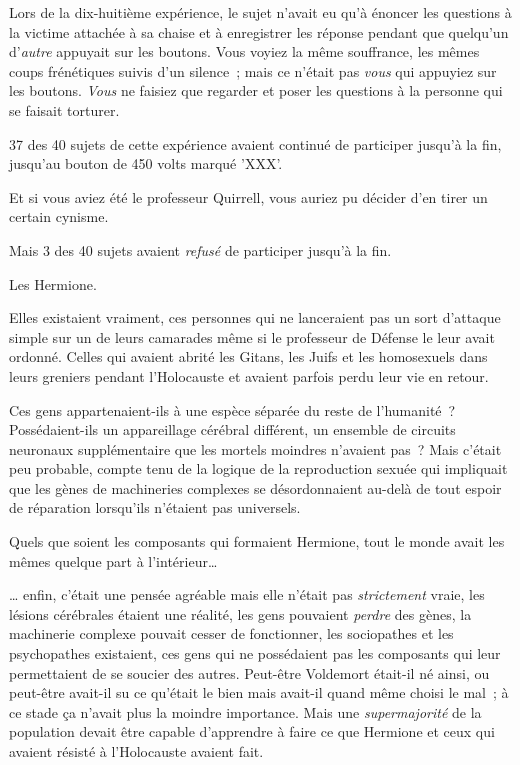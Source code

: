 Lors de la dix-huitième expérience, le sujet n'avait eu qu'à énoncer les questions à la victime attachée à sa chaise et à enregistrer les réponse pendant que quelqu'un d'\emph{autre} appuyait sur les boutons. Vous voyiez la même souffrance, les mêmes coups frénétiques suivis d'un silence~; mais ce n'était pas \emph{vous} qui appuyiez sur les boutons. \emph{Vous} ne faisiez que regarder et poser les questions à la personne qui se faisait torturer.

37 des 40 sujets de cette expérience avaient continué de participer jusqu'à la fin, jusqu'au bouton de 450 volts marqué 'XXX'.

Et si vous aviez été le professeur Quirrell, vous auriez pu décider d'en tirer un certain cynisme.

Mais 3 des 40 sujets avaient \emph{refusé} de participer jusqu'à la fin.

Les Hermione.

Elles existaient vraiment, ces personnes qui ne lanceraient pas un sort d'attaque simple sur un de leurs camarades même si le professeur de Défense le leur avait ordonné. Celles qui avaient abrité les Gitans, les Juifs et les homosexuels dans leurs greniers pendant l'Holocauste et avaient parfois perdu leur vie en retour.

Ces gens appartenaient-ils à une espèce séparée du reste de l'humanité~? Possédaient-ils un appareillage cérébral différent, un ensemble de circuits neuronaux supplémentaire que les mortels moindres n'avaient pas~? Mais c'était peu probable, compte tenu de la logique de la reproduction sexuée qui impliquait que les gènes de machineries complexes se désordonnaient au-delà de tout espoir de réparation lorsqu'ils n'étaient pas universels.

Quels que soient les composants qui formaient Hermione, tout le monde avait les mêmes quelque part à l'intérieur…

… enfin, c'était une pensée agréable mais elle n'était pas \emph{strictement} vraie, les lésions cérébrales étaient une réalité, les gens pouvaient \emph{perdre} des gènes, la machinerie complexe pouvait cesser de fonctionner, les sociopathes et les psychopathes existaient, ces gens qui ne possédaient pas les composants qui leur permettaient de se soucier des autres. Peut-être Voldemort était-il né ainsi, ou peut-être avait-il su ce qu'était le bien mais avait-il quand même choisi le mal~; à ce stade ça n'avait plus la moindre importance. Mais une \emph{supermajorité} de la population devait être capable d'apprendre à faire ce que Hermione et ceux qui avaient résisté à l'Holocauste avaient fait.

